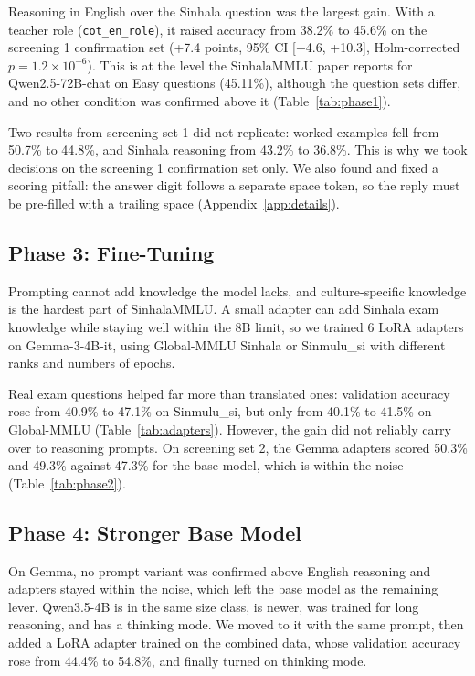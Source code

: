 \documentclass[11pt]{article}
\newcommand{\cond}[1]{\texttt{#1}}
\newcommand{\sinmulu}{Sinmulu\_si}
\begin{document}
Reasoning in English over the Sinhala question was the largest gain. With a teacher role (\cond{cot\_en\_role}), it raised accuracy from 38.2\% to 45.6\% on the screening 1 confirmation set (+7.4 points, 95\% CI [+4.6, +10.3], Holm-corrected $p = 1.2\times10^{-6}$). This is at the level the SinhalaMMLU paper reports for Qwen2.5-72B-chat on Easy questions (45.11\%), although the question sets differ, and no other condition was confirmed above it (Table~\ref{tab:phase1}).

Two results from screening set 1 did not replicate: worked examples fell from 50.7\% to 44.8\%, and Sinhala reasoning from 43.2\% to 36.8\%. This is why we took decisions on the screening 1 confirmation set only. We also found and fixed a scoring pitfall: the answer digit follows a separate space token, so the reply must be pre-filled with a trailing space (Appendix~\ref{app:details}).

\subsection{Phase 3: Fine-Tuning}\label{sec:phase3}
Prompting cannot add knowledge the model lacks, and culture-specific knowledge is the hardest part of SinhalaMMLU. A small adapter can add Sinhala exam knowledge while staying well within the 8B limit, so we trained 6 LoRA adapters on Gemma-3-4B-it, using Global-MMLU Sinhala or \sinmulu{} with different ranks and numbers of epochs.

Real exam questions helped far more than translated ones: validation accuracy rose from 40.9\% to 47.1\% on \sinmulu{}, but only from 40.1\% to 41.5\% on Global-MMLU (Table~\ref{tab:adapters}). However, the gain did not reliably carry over to reasoning prompts. On screening set 2, the Gemma adapters scored 50.3\% and 49.3\% against 47.3\% for the base model, which is within the noise (Table~\ref{tab:phase2}).

\subsection{Phase 4: Stronger Base Model}\label{sec:phase4}
On Gemma, no prompt variant was confirmed above English reasoning and adapters stayed within the noise, which left the base model as the remaining lever. Qwen3.5-4B is in the same size class, is newer, was trained for long reasoning, and has a thinking mode. We moved to it with the same prompt, then added a LoRA adapter trained on the combined data, whose validation accuracy rose from 44.4\% to 54.8\%, and finally turned on thinking mode.
\end{document}
